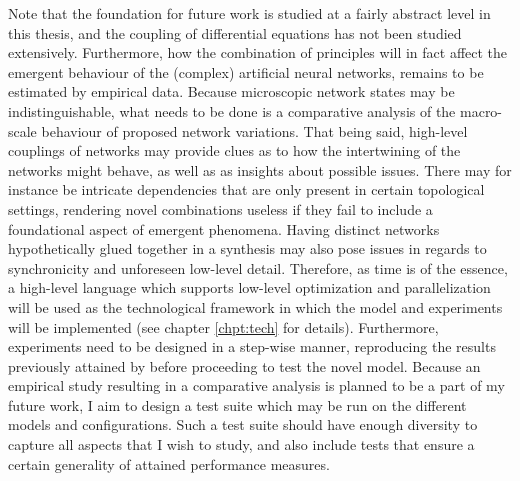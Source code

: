 Note that the foundation for future work is studied at a fairly abstract level in this thesis, and the coupling of differential equations has not been studied extensively. Furthermore, how the combination of principles will in fact affect the emergent behaviour of the (complex) artificial neural networks, remains to be estimated by empirical data. Because microscopic network states may be indistinguishable, what needs to be done is a comparative analysis of the macro-scale behaviour of proposed network variations. That being said, high-level couplings of networks may provide clues as to how the intertwining of the networks might behave, as well as as insights about possible issues. There may for instance be intricate dependencies that are only present in certain topological settings, rendering novel combinations useless if they fail to include a foundational aspect of emergent phenomena. Having distinct networks hypothetically glued together in a synthesis may also pose issues in regards to synchronicity and unforeseen low-level detail.
Therefore, as time is of the essence, a high-level language which supports low-level optimization and parallelization will be used as the technological framework in which the model and experiments will be implemented (see chapter \ref{chpt:tech} for details).
Furthermore, experiments need to be designed in a step-wise manner, reproducing the results previously attained by \cite{Hattori2014} before proceeding to test the novel model. Because an empirical study resulting in a comparative analysis is planned to be a part of my future work, I aim to design a test suite which may be run on the different models and configurations. Such a test suite should have enough diversity to capture all aspects that I wish to study, and also include tests that ensure a certain generality of attained performance measures.

